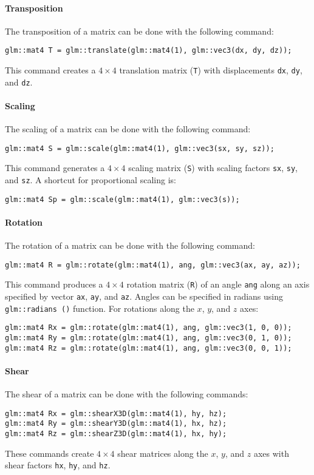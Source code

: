 \paragraph*{Transposition}
The transposition of a matrix can be done with the following command: 
\begin{verbatim}
glm::mat4 T = glm::translate(glm::mat4(1), glm::vec3(dx, dy, dz));
\end{verbatim}
This command creates a $4 \times 4$ translation matrix (\texttt{T}) with displacements \texttt{dx}, \texttt{dy}, and \texttt{dz}.

\paragraph*{Scaling}
The scaling of a matrix can be done with the following command:
\begin{verbatim}
glm::mat4 S = glm::scale(glm::mat4(1), glm::vec3(sx, sy, sz)); 
\end{verbatim}
This command generates a $4 \times 4$ scaling matrix (\texttt{S}) with scaling factors \texttt{sx}, \texttt{sy}, and \texttt{sz}. 
A shortcut for proportional scaling is:
\begin{verbatim}
glm::mat4 Sp = glm::scale(glm::mat4(1), glm::vec3(s)); 
\end{verbatim}

\paragraph*{Rotation}
The rotation of a matrix can be done with the following command:
\begin{verbatim}
glm::mat4 R = glm::rotate(glm::mat4(1), ang, glm::vec3(ax, ay, az));
\end{verbatim}
This command produces a $4 \times 4$ rotation matrix (\texttt{R}) of an angle \texttt{ang} along an axis specified by vector \texttt{ax}, \texttt{ay}, and \texttt{az}. 
Angles can be specified in radians using \texttt{glm::radians ()} function. 
For rotations along the $x$, $y$, and $z$ axes:
\begin{verbatim}
glm::mat4 Rx = glm::rotate(glm::mat4(1), ang, glm::vec3(1, 0, 0));
glm::mat4 Ry = glm::rotate(glm::mat4(1), ang, glm::vec3(0, 1, 0)); 
glm::mat4 Rz = glm::rotate(glm::mat4(1), ang, glm::vec3(0, 0, 1));
\end{verbatim}

\paragraph*{Shear}
The shear of a matrix can be done with the following commands:
\begin{verbatim}
glm::mat4 Rx = glm::shearX3D(glm::mat4(1), hy, hz);
glm::mat4 Ry = glm::shearY3D(glm::mat4(1), hx, hz); 
glm::mat4 Rz = glm::shearZ3D(glm::mat4(1), hx, hy);
\end{verbatim}
These commands create $4 \times 4$ shear matrices along the $x$, $y$, and $z$ axes with shear factors \texttt{hx}, \texttt{hy}, and \texttt{hz}.